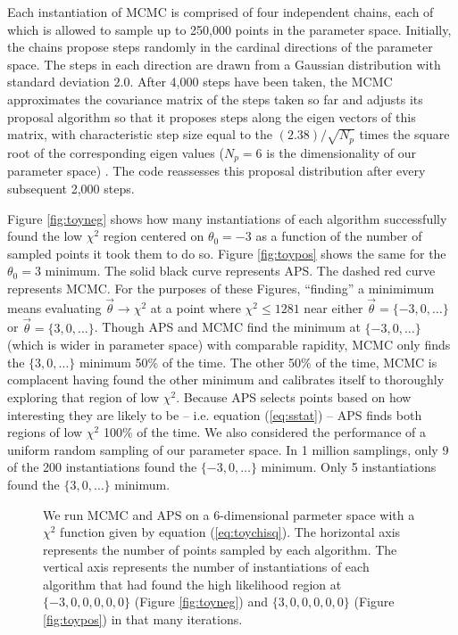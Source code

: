 \documentclass[useAMS,usenatbib]{aastex}
\begin{document}
Each instantiation of MCMC is comprised of four
independent chains, each of which is allowed to sample up to 250,000 points
in the parameter space.  Initially, the chains propose steps randomly
in the cardinal directions of the parameter space.  The steps in each direction
are drawn from a Gaussian 
distribution with standard deviation $2.0$.
After 4,000 steps have been taken, the MCMC approximates the covariance matrix of
the steps taken so far and adjusts its proposal algorithm so that it proposes steps
along the eigen vectors of this matrix, with characteristic step size equal to
the $(2.38)/\sqrt{N_p}$ times the
square root of the corresponding eigen values ($N_p=6$ is the
dimensionality of our parameter space) \cite{gelman}.  
The code reassesses this proposal distribution after 
every subsequent 2,000 steps.

Figure \ref{fig:toyneg} shows how many instantiations
of each algorithm successfully found 
the low $\chi^2$ region centered on $\theta_0=-3$
as a function of the number of
sampled points it took them to do so.  
Figure \ref{fig:toypos} shows the same
for the $\theta_0=3$  minimum.  The solid black curve represents
APS.  The dashed red curve
represents MCMC.  
For the purposes of these Figures, ``finding'' a minimimum means evaluating
$\vec{\theta}\rightarrow\chi^2$ at a point where $\chi^2\le1281$ near either
$\vec{\theta}=\{-3,0,\dots\}$ or $\vec{\theta}=\{3,0,\dots\}$.
Though APS and MCMC find the minimum at $\{-3,0,\dots\}$
(which is wider in parameter space)
with comparable rapidity, MCMC only finds the $\{3,0,\dots\}$
minimum  50\% of the time.  The other 50\% of the time, 
MCMC is complacent having
found the other minimum and calibrates itself to thoroughly exploring
that region of low $\chi^2$.
Because APS selects points based on how interesting they are
likely to be -- i.e. equation (\ref{eq:sstat}) -- APS finds both regions of low
$\chi^2$ 100\% of the time.
We also considered the performance of a uniform random sampling of our parameter
space.  In 1 million samplings, only 9 of the
200 instantiations found the $\{-3,0,\dots\}$ minimum.  
Only 5 instantiations found the $\{3,0,\dots\}$ minimum.

\begin{figure}
\caption{
We run MCMC and APS on a 6-dimensional parmeter space with a $\chi^2$ function
given by equation (\ref{eq:toychisq}).
The horizontal axis represents the number of points sampled by each algorithm.
The vertical axis represents the number of instantiations of each algorithm that
had found the high likelihood region at $\{-3,0,0,0,0,0\}$ (Figure
\ref{fig:toyneg}) and $\{3,0,0,0,0,0\}$ (Figure \ref{fig:toypos}) in that
many iterations.
}
\label{fig:toy}
\end{figure}
\end{document}
